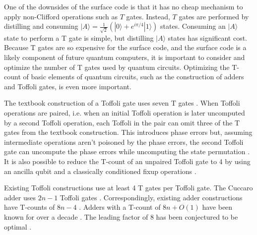 \documentclass[twocolumn]{revtex4-1}
\begin{document}
One of the downsides of the surface code is that it has no cheap mechanism to apply non-Clifford operations such as $T$ gates.
Instead, $T$ gates are performed by distilling and consuming $|A\rangle = \frac{1}{\sqrt{2}} (|0\rangle + e^{i \pi/4} |1\rangle)$ states.
Consuming an $|A\rangle$ state to perform a T gate is simple, but distilling $|A\rangle$ states has significant cost.
Because T gates are so expensive for the surface code, and the surface code is a likely component of future quantum computers, it is important to consider and optimize the number of T gates used by quantum circuits.
Optimizing the T-count of basic elements of quantum circuits, such as the construction of adders and Toffoli gates, is even more important.

The textbook construction of a Toffoli gate uses seven T gates \citep{Nielsen2009}.
When Toffoli operations are paired, i.e. when an initial Toffoli operation is later uncomputed by a second Toffoli operation, each Toffoli in the pair can omit three of the T gates from the textbook construction.
This introduces phase errors but, assuming intermediate operations aren't poisoned by the phase errors, the second Toffoli gate can uncompute the phase errors while uncomputing the state permutation \citep{Barenco1995, Nielsen2009}.
It is also possible to reduce the T-count of an unpaired Toffoli gate to 4 by using an ancilla qubit and a classically conditioned fixup operations \citep{Jones2013}.

Existing Toffoli constructions use at least 4 T gates per Toffoli gate.
The Cuccaro adder uses $2n-1$ Toffoli gates \citep{Cuccaro2004}.
Correspondingly, existing adder constructions have T-counts of $8n-4$ \citep{Amy2013}.
Adders with a T-count of $8n + O(1)$ have been known for over a decade \citep{Barenco1995, Cuccaro2004}.
The leading factor of 8 has been conjectured to be optimal \citep{AustinDiscussionsAndEmails2017}.
\end{document}

